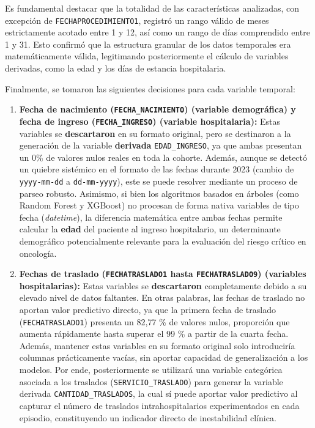 Es fundamental destacar que la totalidad de las características analizadas, con excepción de \texttt{FECHAPROCEDIMIENTO1}, registró un rango válido de meses estrictamente acotado entre 1 y 12, así como un rango de días comprendido entre 1 y 31. Esto confirmó que la estructura granular de los datos temporales era matemáticamente válida, legitimando posteriormente el cálculo de variables derivadas, como la edad y los días de estancia hospitalaria.

Finalmente, se tomaron las siguientes decisiones para cada variable temporal:
\begin{enumerate}
    \item \textbf{Fecha de nacimiento (\texttt{FECHA\_NACIMIENTO}) (variable demográfica) y fecha de ingreso (\texttt{FECHA\_INGRESO}) (variable hospitalaria):} Estas variables se \textbf{descartaron} en su formato original, pero se destinaron a la generación de la variable \textbf{derivada} \texttt{EDAD\_INGRESO}, ya que ambas presentan un 0\% de valores nulos reales en toda la cohorte. Además, aunque se detectó un quiebre sistémico en el formato de las fechas durante 2023 (cambio de \texttt{yyyy-mm-dd} a \texttt{dd-mm-yyyy}), este se puede resolver mediante un proceso de parseo robusto. Asimismo, si bien los algoritmos basados en árboles (como Random Forest y XGBoost) no procesan de forma nativa variables de tipo fecha (\textit{datetime}), la diferencia matemática entre ambas fechas permite calcular la \textbf{edad} del paciente al ingreso hospitalario, un determinante demográfico potencialmente relevante para la evaluación del riesgo crítico en oncología.
    \item \textbf{Fechas de traslado (\texttt{FECHATRASLADO1} hasta \texttt{FECHATRASLADO9}) (variables hospitalarias):} Estas variables se \textbf{descartaron} completamente debido a su elevado nivel de datos faltantes. En otras palabras, las fechas de traslado no aportan valor predictivo directo, ya que la primera fecha de traslado (\texttt{FECHATRASLADO1}) presenta un 82,77 \% de valores nulos, proporción que aumenta rápidamente hasta superar el 99 \% a partir de la cuarta fecha. Además, mantener estas variables en su formato original solo introduciría columnas prácticamente vacías, sin aportar capacidad de generalización a los modelos. Por ende, posteriormente se utilizará una variable categórica asociada a los traslados (\texttt{SERVICIO\_TRASLADO}) para generar la variable derivada \texttt{CANTIDAD\_TRASLADOS}, la cual sí puede aportar valor predictivo al capturar el número de traslados intrahospitalarios experimentados en cada episodio, constituyendo un indicador directo de inestabilidad clínica.

\end{enumerate}
